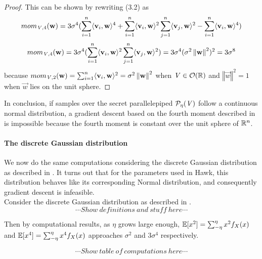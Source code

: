 \begin{proof}
This can be shown by rewriting (3.2) as  
\[ mom_{\mat{V}, 4}(\vec{w}) = 3\sigma^4(\sum_{i=1}^n \langle \vec{v}_i, \vec{w}\rangle^4 + \sum_{i=1}^n \langle \vec{v}_i, \vec{w} \rangle^2 \sum_{j=1}^n \langle \vec{v}_j, \vec{w}\rangle^2 - \sum_{i=1}^n\langle \vec{v}_i, \vec{w}\rangle^4 )\]
\[ mom_{\mat{V}, 4}(\vec{w}) = 3\sigma^4(\sum_{i=1}^n \langle \vec{v}_i, \vec{w}\rangle^2 \sum_{j=1}^n \langle \vec{v}_j, \vec{w}\rangle^2) = 3\sigma^4(\sigma^2\left \Vert \vec{w} \right \Vert^2)^2 = 3\sigma^8\]
because $mom_{\mat{V}, 2}(\vec{w}) = \sum_{i=1}^n \langle \vec{v}_i, \vec{w}\rangle^2 = \sigma^2 \left \Vert \vec{w} \right \Vert^2$ when $\mat{V} \in \mathcal{O}(\bb{R})$ and $\left \Vert \vec{w} \right \Vert^2 = 1$ when $\vec{w}$ lies on the unit sphere.
\end{proof}

In conclusion, if samples over the secret parallelepiped $\PP[\eta]{V}$ follow a continuous normal distribution, a gradient descent based on the fourth moment described in \cite{NR09}
is impossible because the fourth moment is constant over the unit sphere of $\bb{R}^n$.

\paragraph{The discrete Gaussian distribution}
We now do the same computations considering the discrete Gaussian distribution as described in \cite{HawkSpec24}. 
It turns out that for the parameters used in Hawk, this distribution behaves like its corresponding Normal distribution, and consequently gradient descent
is infeasible. \\ 
Consider the discrete Gaussian distribution as described in \cite{HawkSpec24}.
\[\cdots Show \ definitions \ and \ stuff \ here \cdots\]

Then by computational results, as $\eta$ grows large enough, $\bb{E}[x^2] = \sum_{-\eta}^{\eta} x^2 f_X(x)$ and $\bb{E}[x^4] = \sum_{-\eta}^{\eta} x^4 f_X(x)$ approaches $\sigma^2$ and $3 \sigma^4$ respectively. 

\[\cdots Show \ table \ of \ computations \ here \cdots\]
